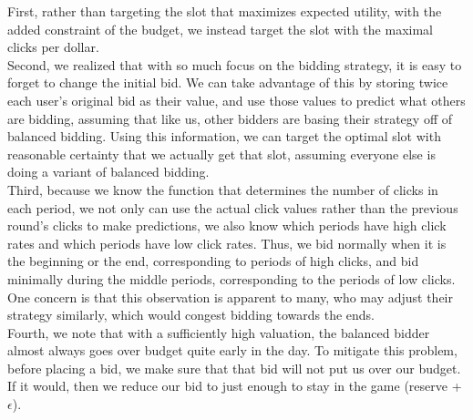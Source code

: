 \documentclass[12pt]{article}
\begin{document}
First, rather than targeting the slot that maximizes expected utility, with the added constraint of the budget, we instead target the slot with the maximal clicks per dollar. \\

Second, we realized that with so much focus on the bidding strategy, it is easy to forget to change the initial bid. We can take advantage of this by storing twice each user's original bid as their value, and use those values to predict what others are bidding, assuming that like us, other bidders are basing their strategy off of balanced bidding. Using this information, we can target the optimal slot with reasonable certainty that we actually get that slot, assuming everyone else is doing a variant of balanced bidding. \\

Third, because we know the function that determines the number of clicks in each period, we not only can use the actual click values rather than the previous round's clicks to make predictions, we also know which periods have high click rates and which periods have low click rates. Thus, we bid normally when it is the beginning or the end, corresponding to periods of high clicks, and bid minimally during the middle periods, corresponding to the periods of low clicks. One concern is that this observation is apparent to many, who may adjust their strategy similarly, which would congest bidding towards the ends.\\

Fourth, we note that with a sufficiently high valuation, the balanced bidder almost always goes over budget quite early in the day. To mitigate this problem, before placing a bid, we make sure that that bid will not put us over our budget. If it would, then we reduce our bid to just enough to stay in the game (reserve + $\epsilon$).\\
\end{document}
